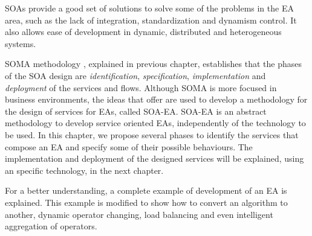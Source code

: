 \label{chap:soaea}
\minitoc\mtcskip
\vfill
\lettrine{S}{OA}s provide a good set of solutions to solve some of the
problems in the EA area, such as the lack of integration,
standardization and dynamism control. It also allows ease of
development in dynamic, distributed and heterogeneous systems. %

SOMA methodology \cite{Arsanjani2008SOMA}, explained in previous chapter, establishes that the phases of the SOA design are {\em identification}, {\em specification}, {\em implementation} and {\em deployment} of the services and flows. Although SOMA is more focused in business environments, the ideas that offer are used to develop a methodology for the design of services for EAs, called SOA-EA. SOA-EA is an abstract methodology to develop service oriented EAs, independently of the technology to be used. In this chapter, we propose several phases to identify the services that compose an EA and specify some of their possible behaviours. The implementation and deployment of the designed services will be explained, using an specific technology, in the next chapter.

For a better understanding, a complete example of development of an EA
is explained. This example is modified to show how to convert an
algorithm to another, dynamic operator changing, load balancing and
even intelligent aggregation of operators.




